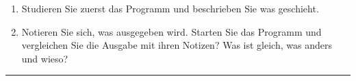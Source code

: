\documentclass[a4paper,10pt,english]{report}
\begin{document}
\sphinxAtStartPar
{}
\begin{enumerate}
%
\item {} 
\sphinxAtStartPar
Studieren Sie zuerst das Programm  und beschrieben Sie was geschieht.

\begin{sphinxVerbatim}[commandchars=\\\{\}]

\end{sphinxVerbatim}

\item {} 
\sphinxAtStartPar
Notieren Sie sich, was ausgegeben wird. Starten Sie das Programm und vergleichen Sie die Ausgabe mit ihren Notizen? Was ist gleich, was anders und wieso?

\begin{sphinxVerbatim}[commandchars=\\\{\}]

\end{sphinxVerbatim}

\end{enumerate}


\bigskip\hrule\bigskip
\end{document}
